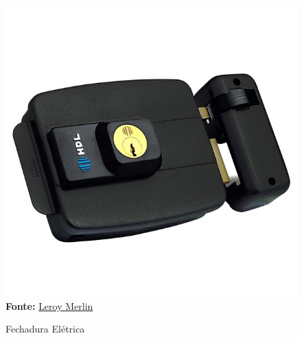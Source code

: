 \FloatBarrier
\begin{figure}[!htbp]
	\centering
	\caption{Fechadura Elétrica}
	\includegraphics[scale=.25]{imagens/eletrica}
	\\\textbf{Fonte:} \href{https://www.leroymerlin.com.br/fechadura-eletrica-c-90-ajustavel-12v-preto-hdl_86491860}{Leroy Merlin}
	\label{fig:eletrica}
\end{figure}
\FloatBarrier

